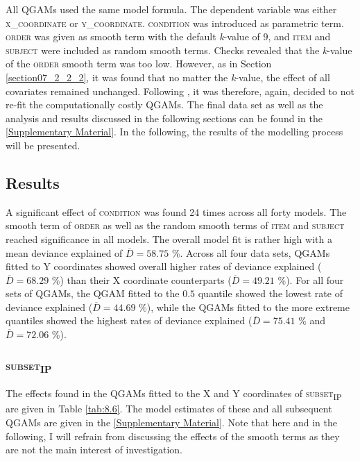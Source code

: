 All QGAMs used the same model formula. The dependent variable was either \textsc{x\_coordinate} or \textsc{y\_coordinate}. \textsc{condition} was introduced as parametric term. \textsc{order} was given as smooth term with the default \textit{k}-value of $9$, and \textsc{item} and \textsc{subject} were included as random smooth terms. Checks revealed that the \textit{k}-value of the \textsc{order} smooth term was too low. However, as in Section \ref{section07_2_2_2}, it was found that no matter the \textit{k}-value, the effect of all covariates remained unchanged. Following \citet{Wood2017}, it was therefore, again, decided to not re-fit the computationally costly QGAMs. The final data set as well as the analysis and results discussed in the following sections can be found in the \ref{Supplementary Material}. In the following, the results of the modelling process will be presented.

\subsection{Results}\label{section08_2_2}

A significant effect of \textsc{condition} was found 24 times across all forty models. The smooth term of \textsc{order} as well as the random smooth terms of \textsc{item} and \textsc{subject} reached significance in all models. The overall model fit is rather high with a mean deviance explained of $\overline{D}=58.75$ \%. Across all four data sets, QGAMs fitted to Y coordinates showed overall higher rates of deviance explained ($\overline{D}=68.29$ \%) than their X coordinate counterparts ($\overline{D}=49.21$ \%). For all four sets of QGAMs, the QGAM fitted to the $0.5$ quantile showed the lowest rate of deviance explained ($\overline{D}=44.69$ \%), while the QGAMs fitted to the more extreme quantiles showed the highest rates of deviance explained ($\overline{D}=75.41$ \% and $\overline{D}=72.06$ \%).

\subsubsection{\textsc{subset\textsubscript{IP}}}\label{section08_2_2_1}

The effects found in the QGAMs fitted to the X and Y coordinates of \textsc{subset\textsubscript{IP}} are given in Table \ref{tab:8.6}. The model estimates of these and all subsequent QGAMs are given in the \ref{Supplementary Material}. Note that here and in the following, I will refrain from discussing the effects of the smooth terms as they are not the main interest of investigation. 

